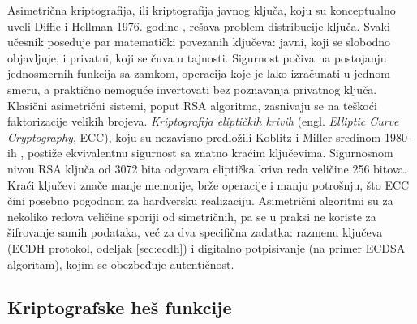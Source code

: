 Asimetrična kriptografija, ili kriptografija javnog ključa, koju su konceptualno uveli Diffie i Hellman 1976. godine \cite{diffie_hellman}, rešava problem distribucije ključa. Svaki učesnik poseduje par matematički povezanih ključeva: javni, koji se slobodno objavljuje, i privatni, koji se čuva u tajnosti. Sigurnost počiva na postojanju jednosmernih funkcija sa zamkom, operacija koje je lako izračunati u jednom smeru, a praktično nemoguće invertovati bez poznavanja privatnog ključa.
\smallbreak
Klasični asimetrični sistemi, poput RSA algoritma, zasnivaju se na teškoći faktorizacije velikih brojeva. \textit{Kriptografija eliptičkih krivih} (engl. \textit{Elliptic Curve Cryptography}, ECC), koju su nezavisno predložili Koblitz i Miller sredinom 1980-ih \cite{koblitz, miller}, postiže ekvivalentnu sigurnost sa znatno kraćim ključevima. Sigurnosnom nivou RSA ključa od 3072 bita odgovara eliptička kriva reda veličine 256 bitova. Kraći ključevi znače manje memorije, brže operacije i manju potrošnju, što ECC čini posebno pogodnom za hardversku realizaciju.
\smallbreak
Asimetrični algoritmi su za nekoliko redova veličine sporiji od simetričnih, pa se u praksi ne koriste za šifrovanje samih podataka, već za dva specifična zadatka: razmenu ključeva (ECDH protokol, odeljak \ref{sec:ecdh}) i digitalno potpisivanje (na primer ECDSA algoritam), kojim se obezbeđuje autentičnost.

\subsection{Kriptografske heš funkcije}
\label{subsec:hash}


